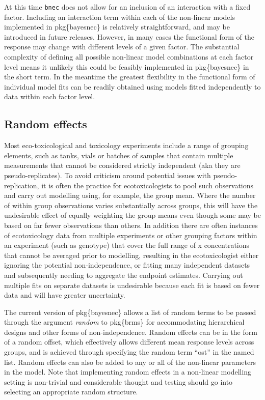\documentclass[
]{jss}
\begin{document}
At this time \texttt{bnec} does not allow for an inclusion of an
interaction with a fixed factor. Including an interaction term within
each of the non-linear models implemented in pkg\{bayesnec\} is
relatively straightforward, and may be introduced in future releases.
However, in many cases the functional form of the response may change
with different levels of a given factor. The substantial complexity of
defining all possible non-linear model combinations at each factor level
means it unlikely this could be feasibly implemented in pkg\{bayesnec\}
in the short term. In the meantime the greatest flexibility in the
functional form of individual model fits can be readily obtained using
models fitted independently to data within each factor level.

\hypertarget{random-effects}{%
\subsection{Random effects}\label{random-effects}}

Most eco-toxicological and toxicology experiments include a range of
grouping elements, such as tanks, vials or batches of samples that
contain multiple measurements that cannot be considered strictly
independent (aka they are pseudo-replicates). To avoid criticism around
potential issues with pseudo-replication, it is often the practice for
ecotoxicologists to pool such observations and carry out modelling
using, for example, the group mean. Where the number of within group
observations varies substantially across groups, this will have the
undesirable effect of equally weighting the group means even though some
may be based on far fewer observations than others. In addition there
are often instances of ecotoxicology data from multiple experiments or
other grouping factors within an experiment (such as genotype) that
cover the full range of x concentrations that cannot be averaged prior
to modelling, resulting in the ecotoxicologist either ignoring the
potential non-independence, or fitting many independent datasets and
subsequently needing to aggregate the endpoint estimates. Carrying out
multiple fits on separate datasets is undesirable because each fit is
based on fewer data and will have greater uncertainty.

The current version of pkg\{bayesnec\} allows a list of random terms to
be passed through the argument \emph{random} to pkg\{brms\} for
accommodating hierarchical designs and other forms of non-independence.
Random effects can be in the form of a random offset, which effectively
allows different mean response levels across groups, and is achieved
through specifying the random term ``ost'' in the named list. Random
effects can also be added to any or all of the non-linear parameters in
the model. Note that implementing random effects in a non-linear
modelling setting is non-trivial and considerable thought and testing
should go into selecting an appropriate random structure.
\end{document}
